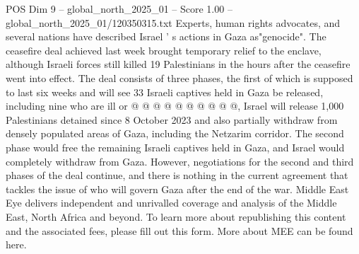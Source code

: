 \begin{textsample}{POS Dim 9 – global\_north\_2025\_01 – Score 1.00 – global\_north\_2025\_01/120350315.txt}
Experts, human rights advocates, and several nations have described Israel ' s actions in Gaza as"genocide".
The ceasefire deal achieved last week brought temporary relief to the enclave, although Israeli forces still killed 19 Palestinians in the hours after the ceasefire went into effect.
The deal consists of three phases, the first of which is supposed to last six weeks and will see 33 Israeli captives held in Gaza be released, including nine who are ill or @ @ @ @ @ @ @ @ @ @, Israel will release 1,000 Palestinians detained since 8 October 2023 and also partially withdraw from densely populated areas of Gaza, including the Netzarim corridor.
The second phase would free the remaining Israeli captives held in Gaza, and Israel would completely withdraw from Gaza.
However, negotiations for the second and third phases of the deal continue, and there is nothing in the current agreement that tackles the issue of who will govern Gaza after the end of the war.
Middle East Eye delivers independent and unrivalled coverage and analysis of the Middle East, North Africa and beyond.
To learn more about republishing this content and the associated fees, please fill out this form.
More about MEE can be found here.

\end{textsample}
